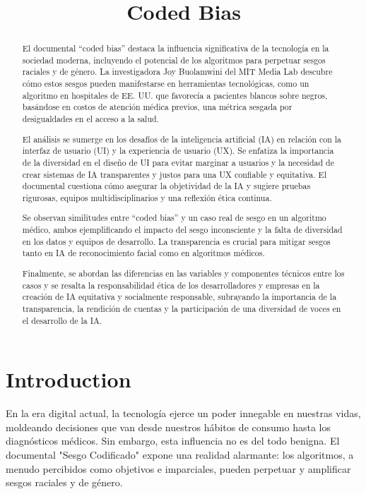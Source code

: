 \documentclass[conference]{IEEEtran}
\title{Coded Bias}
\author{\IEEEauthorblockN{Michael Esteban Castillo Lopez, 506221049}}
\begin{document}
\maketitle

\begin{abstract}
El documental “coded bias” destaca la influencia significativa de la tecnología en la sociedad moderna, incluyendo el potencial de los algoritmos para perpetuar sesgos raciales y de género. La investigadora Joy Buolamwini del MIT Media Lab descubre cómo estos sesgos pueden manifestarse en herramientas tecnológicas, como un algoritmo en hospitales de EE. UU. que favorecía a pacientes blancos sobre negros, basándose en costos de atención médica previos, una métrica sesgada por desigualdades en el acceso a la salud.

El análisis se sumerge en los desafíos de la inteligencia artificial (IA) en relación con la interfaz de usuario (UI) y la experiencia de usuario (UX). Se enfatiza la importancia de la diversidad en el diseño de UI para evitar marginar a usuarios y la necesidad de crear sistemas de IA transparentes y justos para una UX confiable y equitativa. El documental cuestiona cómo asegurar la objetividad de la IA y sugiere pruebas rigurosas, equipos multidisciplinarios y una reflexión ética continua.

Se observan similitudes entre “coded bias” y un caso real de sesgo en un algoritmo médico, ambos ejemplificando el impacto del sesgo inconsciente y la falta de diversidad en los datos y equipos de desarrollo. La transparencia es crucial para mitigar sesgos tanto en IA de reconocimiento facial como en algoritmos médicos.

Finalmente, se abordan las diferencias en las variables y componentes técnicos entre los casos y se resalta la responsabilidad ética de los desarrolladores y empresas en la creación de IA equitativa y socialmente responsable, subrayando la importancia de la transparencia, la rendición de cuentas y la participación de una diversidad de voces en el desarrollo de la IA.
\end{abstract}

\section{Introduction}

En la era digital actual, la tecnología ejerce un poder innegable en nuestras vidas, moldeando decisiones que van desde nuestros hábitos de consumo hasta los diagnósticos médicos. Sin embargo, esta influencia no es del todo benigna. El documental "Sesgo Codificado" expone una realidad alarmante: los algoritmos, a menudo percibidos como objetivos e imparciales, pueden perpetuar y amplificar sesgos raciales y de género.\\
\end{document}

